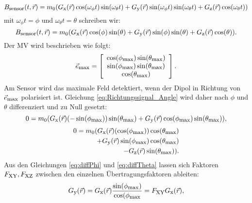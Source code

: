 \begin{equation}
     B_{\textrm{\footnotesize{sensor}}}(t,\vec{r}) = m_0 ( G_{\textrm{\footnotesize{x}}}(\vec{r}) \cos(\omega_\phi t) \sin(\omega_\theta t) +G_{\textrm{\footnotesize{y}}}(\vec{r}) \sin(\omega_\phi t)\sin(\omega_\theta t) + G_{\textrm{\footnotesize{z}}}(\vec{r}) \cos(\omega_\theta t))
    \label{eq:Richtungssignal}
\end{equation}
mit $\omega_\phi t = \phi$ und $\omega_\theta t = \theta$ schreiben wir:
\begin{equation}
     B_{\textrm{\footnotesize{sensor}}}(t,\vec{r}) = m_0 ( G_{\textrm{\footnotesize{x}}}(\vec{r}) \cos(\phi ) \sin(\theta ) +G_{\textrm{\footnotesize{y}}}(\vec{r}) \sin(\phi)\sin(\theta) + G_{\textrm{\footnotesize{z}}}(\vec{r}) \cos(\theta)).
     \label{eq:Richtungssignal_Angle}
\end{equation}
Der MV wird beschrieben wie folgt:
\begin{equation}
                \vec{e}_{\textrm{\footnotesize{max}}} =  \left[\begin{array}{c} \cos(\phi_{\textrm{\footnotesize{max}}}) \sin(\theta _{\textrm{\footnotesize{max}}})\\ \sin(\phi_{\textrm{\footnotesize{max}}})\sin(\theta_{\textrm{\footnotesize{max}}})\\ \cos(\theta_{\textrm{\footnotesize{max}}}) \end{array}\right].
    \label{eq:rotDipole}
\end{equation}
Am Sensor wird das maximale Feld detektiert, wenn der Dipol in Richtung von $\vec{e}_{\textrm{\footnotesize{max}}}$ polarisiert ist. Gleichung \ref{eq:Richtungssignal_Angle} wird daher nach $\phi$ und $\theta$ differenziert und zu Null gesetzt:
\begin{equation}
    0 = m_0 ( G_{\textrm{\footnotesize{x}}}(\vec{r}) (-\sin(\phi_{\textrm{\footnotesize{max}}} )) \sin(\theta_{\textrm{\footnotesize{max}}} ) +G_{\textrm{\footnotesize{y}}}(\vec{r}) \cos(\phi_{\textrm{\footnotesize{max}}})\sin(\theta_{\textrm{\footnotesize{max}}})) ,
    \label{eq:diffPhi}
\end{equation}
\begin{equation}
\begin{split}
    0 = m_0 ( G_{\textrm{\footnotesize{x}}}(\vec{r}) (\cos(\phi_{\textrm{\footnotesize{max}}} )) \cos(\theta_{\textrm{\footnotesize{max}}} ) \\  +G_{\textrm{\footnotesize{y}}}(\vec{r}) \sin(\phi_{\textrm{\footnotesize{max}}})\cos(\theta_{\textrm{\footnotesize{max}}}) \\ - G_{\textrm{\footnotesize{z}}}(\vec{r})\sin(\theta_{\textrm{\footnotesize{max}}} )).
    \label{eq:diffTheta}
\end{split}
\end{equation}
Aus den Gleichungen \ref{eq:diffPhi} und \ref{eq:diffTheta} lassen sich Faktoren $F_{\textrm{\footnotesize{XY}}},F_{\textrm{\footnotesize{XZ}}}$ zwischen den einzelnen Übertragungsfaktoren ableiten:
\begin{equation}
    G_{\textrm{\footnotesize{y}}}(\vec{r}) = G_{\textrm{\footnotesize{x}}}(\vec{r}) \frac{\sin(\phi_{\textrm{\footnotesize{max}}})}{\cos(\phi_{\textrm{\footnotesize{max}}}} = F_{\textrm{\footnotesize{XY}}} G_{\textrm{\footnotesize{x}}}(\vec{r}),
    \label{eq:FaktorYX}
\end{equation}
